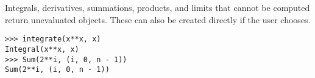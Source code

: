 Integrals, derivatives, summations, products, and limits that cannot be
computed return unevaluated objects. These can also be created directly if the
user chooses.
\begin{verbatim}
>>> integrate(x**x, x)
Integral(x**x, x)
>>> Sum(2**i, (i, 0, n - 1))
Sum(2**i, (i, 0, n - 1))
\end{verbatim}
